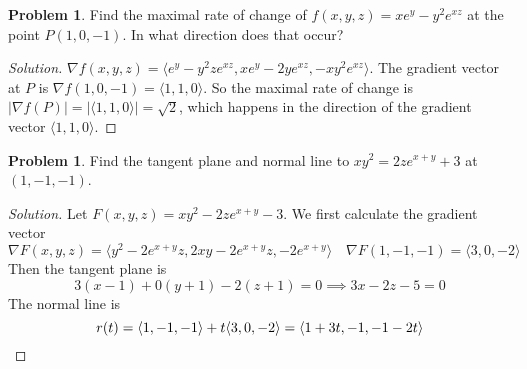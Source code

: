 \documentclass[12pt]{amsart}%
\theoremstyle{plain}
\theoremstyle{definition}
\newtheorem{prob}[theorem]{Problem}
\theoremstyle{special}
\newcommand{\sol}[1]{
{\begin{proof}[Solution]#1\end{proof}}
}
\newcommand{\Prob}[1]{\begin{tcolorbox}%
\begin{prob}
	#1
\end{prob}
\end{tcolorbox}	
}
\begin{document}
\Prob{Find the maximal rate of change of $f(x,y,z)=xe^y-y^2e^{xz}$ at the point $P(1,0,-1)$. In what direction does that occur?}
\sol{$\nabla f(x,y,z)=\langle e^y - y^2 z e^{x z}, x e^y - 2 y e^{x z}, -x y^2e^{x z}\rangle $. The gradient vector at $P$ is
$\nabla f(1,0,-1)=\langle 1,1,0 \rangle$. 
So the maximal rate of change is $|\nabla f(P)|=|\langle 1,1,0\rangle|=\sqrt{2}$, which happens in the direction of the gradient vector $\langle 1,1,0\rangle $. 
}
\Prob{Find the tangent plane and normal line to $xy^2=2ze^{x+y}+3$ at $(1,-1,-1)$.}
\sol{Let $F(x,y,z)=xy^2-2ze^{x+y}-3$. We first calculate the gradient vector
\[\nabla F(x,y,z)=\langle y^2 - 2 e^{x + y} z, 2 x y - 2 e^{x + y} z, -2 e^{x + y}\rangle\quad\nabla F(1,-1,-1)=\langle 3,0,-2\rangle \]
Then the tangent plane is
\[3(x-1)+0(y+1)-2(z+1)=0\implies 3x-2z-5=0 \]
The normal line is
\[r(t)=\langle 1,-1,-1\rangle +t\langle 3,0,-2\rangle =\langle 1+3t,-1,-1-2t \rangle \qedhere\]
 }
%
\end{document}
